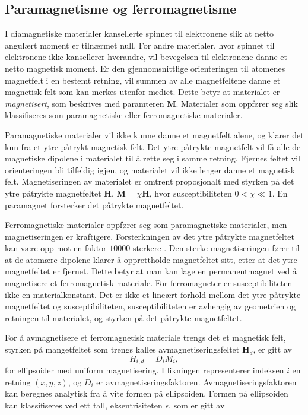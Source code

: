\documentclass[%
 reprint,
 amsmath,amssymb,
 aps,
 norsk,
]{revtex4-1}
\begin{document}
\subsection{Paramagnetisme og ferromagnetisme}
I diamagnetiske materialer kansellerte spinnet til elektronene slik at netto angulært moment er tilnærmet null. For andre materialer, hvor spinnet til elektronene ikke kansellerer hverandre, vil bevegelsen til elektronene danne et netto magnetisk moment. Er den gjennomsnittlige orienteringen til atomenes magnetfelt i en bestemt retning, vil summen av alle magnetfeltene danne et magnetisk felt som kan merkes utenfor mediet. Dette betyr at materialet er \textit{magnetisert}, som beskrives med paramteren $\bm{M}$. Materialer som oppfører seg slik klassifiseres som paramagnetiske eller ferromagnetiske materialer.\par
Paramagnetiske materialer vil ikke kunne danne et magnetfelt alene, og klarer det kun fra et ytre påtrykt magnetisk felt. Det ytre påtrykte magnetfelt vil få alle de magnetiske dipolene i materialet til å rette seg i samme retning. Fjernes feltet vil orienteringen bli tilfeldig igjen, og materialet vil ikke lenger danne et magnetisk felt. Magnetiseringen av materialet er omtrent proposjonalt med styrken på det ytre påtrykte magnetfeltet $\bm{H}$, $\bm{M} = \chi\bm{H}$, hvor susceptibiliteten $0<\chi\ll1$. En paramagnet forsterker det påtrykte magnetfeltet.
\par
Ferromagnetiske materialer oppfører seg som paramagnetiske materialer, men magnetiseringen er kraftigere. Forsterkningen av det ytre påtrykte magnetfeltet kan være opp mot en faktor $10 000$ sterkere \cite{oppgave}. Den sterke magnetiseringen fører til at de atomære dipolene klarer å opprettholde magnetfeltet sitt, etter at det ytre magnetfeltet er fjernet. Dette betyr at man kan lage en permanentmagnet ved å magnetisere et ferromagnetisk materiale. For ferromagneter er susceptibiliteten ikke en materialkonstant. Det er ikke et lineært forhold mellom det ytre påtrykte magnetfeltet og susceptibiliteten, susceptibiliteten er avhengig av geometrien og retningen til materialet, og styrken på det påtrykte magnetfeltet.
\par
For å avmagnetisere et ferromagnetisk materiale trengs det et magnetisk felt, styrken på mangetfeltet som trengs kalles avmagnetiseringsfeltet $\bm{H}_d$, er gitt av
\begin{equation}
  H_{i, d} = D_iM_i, \label{calc_avmag}
\end{equation}
for ellipsoider med uniform magnetisering. I likningen representerer indeksen $i$ en retning $(x, y, z)$, og $D_i$ er avmagnetiseringsfaktoren. Avmagnetiseringsfaktoren kan beregnes analytisk fra å vite formen på ellipsoiden. Formen på ellipsoiden kan klassifiseres ved ett tall, eksentrisiteten $\epsilon$, som er gitt av
\end{document}
